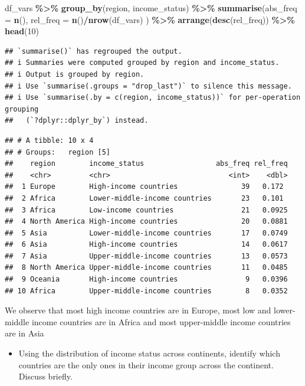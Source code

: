 \documentclass[
]{article}
\newenvironment{Shaded}{\begin{snugshade}}{\end{snugshade}}
\newcommand{\AttributeTok}[1]{\textcolor[rgb]{0.13,0.29,0.53}{#1}}
\newcommand{\DecValTok}[1]{\textcolor[rgb]{0.00,0.00,0.81}{#1}}
\newcommand{\FunctionTok}[1]{\textcolor[rgb]{0.13,0.29,0.53}{\textbf{#1}}}
\newcommand{\NormalTok}[1]{#1}
\newcommand{\SpecialCharTok}[1]{\textcolor[rgb]{0.81,0.36,0.00}{\textbf{#1}}}
\providecommand{\tightlist}{%
  \setlength{\itemsep}{0pt}\setlength{\parskip}{0pt}}
\begin{document}
\begin{Shaded}
\begin{Highlighting}[]
\NormalTok{df\_vars }\SpecialCharTok{\%\textgreater{}\%}
  \FunctionTok{group\_by}\NormalTok{(region, income\_status) }\SpecialCharTok{\%\textgreater{}\%}
  \FunctionTok{summarise}\NormalTok{(}\AttributeTok{abs\_freq =} \FunctionTok{n}\NormalTok{(), }\AttributeTok{rel\_freq =} \FunctionTok{n}\NormalTok{()}\SpecialCharTok{/}\FunctionTok{nrow}\NormalTok{(df\_vars) ) }\SpecialCharTok{\%\textgreater{}\%}
  \FunctionTok{arrange}\NormalTok{(}\FunctionTok{desc}\NormalTok{(rel\_freq)) }\SpecialCharTok{\%\textgreater{}\%}
  \FunctionTok{head}\NormalTok{(}\DecValTok{10}\NormalTok{)}
\end{Highlighting}
\end{Shaded}

\begin{verbatim}
## `summarise()` has regrouped the output.
## i Summaries were computed grouped by region and income_status.
## i Output is grouped by region.
## i Use `summarise(.groups = "drop_last")` to silence this message.
## i Use `summarise(.by = c(region, income_status))` for per-operation grouping
##   (`?dplyr::dplyr_by`) instead.
\end{verbatim}

\begin{verbatim}
## # A tibble: 10 x 4
## # Groups:   region [5]
##    region        income_status                 abs_freq rel_freq
##    <chr>         <chr>                            <int>    <dbl>
##  1 Europe        High-income countries               39   0.172 
##  2 Africa        Lower-middle-income countries       23   0.101 
##  3 Africa        Low-income countries                21   0.0925
##  4 North America High-income countries               20   0.0881
##  5 Asia          Lower-middle-income countries       17   0.0749
##  6 Asia          High-income countries               14   0.0617
##  7 Asia          Upper-middle-income countries       13   0.0573
##  8 North America Upper-middle-income countries       11   0.0485
##  9 Oceania       High-income countries                9   0.0396
## 10 Africa        Upper-middle-income countries        8   0.0352
\end{verbatim}

We observe that most high income countries are in Europe, most low and
lower-middle income countries are in Africa and most upper-middle income
countries are in Asia

\begin{itemize}
\tightlist
\item
  Using the distribution of income status across continents, identify
  which countries are the only ones in their income group across the
  continent. Discuss briefly.
\end{itemize}
\end{document}
